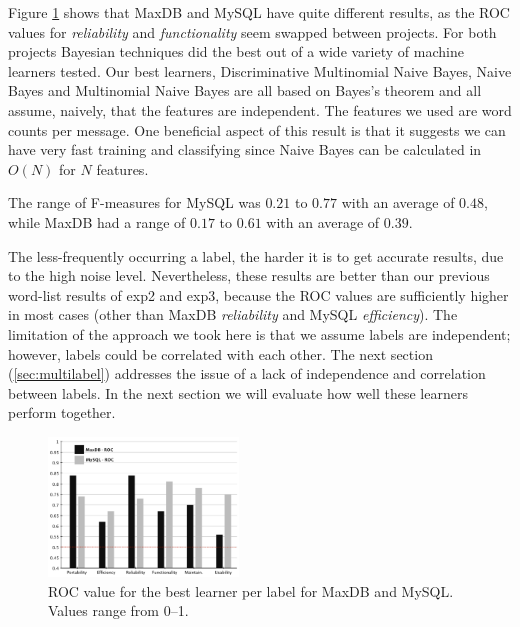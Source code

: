 \documentclass[]{sig-alternate}
\begin{document}
Figure \ref{fig:best-learn-per-tag} shows that MaxDB and MySQL have quite different results, as the ROC values for \emph{reliability} and \emph{functionality} seem swapped between projects. 
For both projects Bayesian techniques did the best out of a wide variety of machine learners tested. 
Our best learners, Discriminative Multinomial Naive Bayes, Naive Bayes  and Multinomial Naive Bayes  are all based on Bayes's theorem and all assume, naively, that the features are independent. 
The features we used are word counts per message. 
One beneficial aspect of this result is that it suggests we can have very fast training and classifying  since Naive Bayes can be calculated in $O(N)$ for $N$ features.


The range of F-measures for MySQL was $0.21$ to $0.77$ with an average
of $0.48$, while MaxDB had a range of $0.17$ to $0.61$ with an average
of $0.39$.


The less-frequently occurring a label, the harder it is to get accurate
results, due to the high noise level. Nevertheless, these results are
better than our previous word-list results of \textsf{exp2} and
\textsf{exp3}, because the ROC values are sufficiently higher in most
cases (other than MaxDB \emph{reliability} and MySQL \emph{efficiency}). The
limitation of the approach we took here is that we assume labels are
independent; however, labels could be correlated with each other. 
The next section (\ref{sec:multilabel})
addresses the issue of a lack of independence and correlation between labels.
In the next section we will evaluate how well these learners perform
together.

\begin{figure}
\centering
\includegraphics[width=0.45\textwidth]{figures/both-supervised}
\caption[]{ROC value for the best learner per label for MaxDB and MySQL. Values range from 0--1.
}
\label{fig:best-learn-per-tag}
\end{figure}
\end{document}

